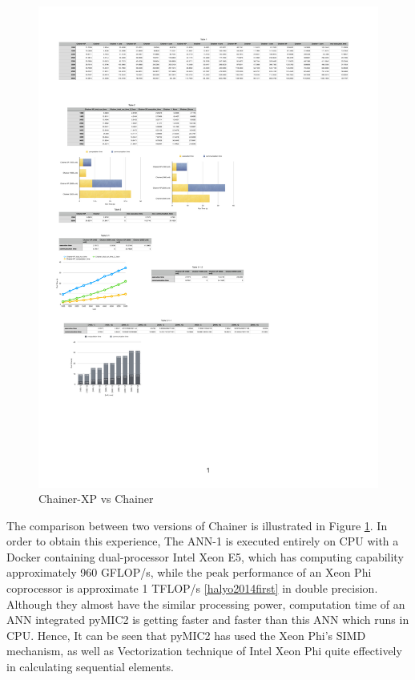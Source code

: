 \begin{figure}[]
\centering
\includegraphics[scale=0.6]{img/c.pdf}
\caption{Chainer-XP vs Chainer}
\label{chainer-xp-vs-chainer}
\end{figure}

The comparison between two versions of Chainer is illustrated in Figure \ref{chainer-xp-vs-chainer}. In order to obtain this experience, The ANN-1 is executed entirely on CPU with a Docker containing dual-processor Intel Xeon E5, which has computing capability approximately 960 GFLOP/s, while the peak performance of an Xeon Phi coprocessor is approximate 1 TFLOP/s \ref{halyo2014first} in double precision. Although they almost have the similar processing power, computation time of an ANN integrated pyMIC2  is getting faster and faster than this ANN which runs in CPU. Hence, It can be seen that pyMIC2 has used the Xeon Phi's SIMD mechanism, as well as Vectorization technique of Intel Xeon Phi quite effectively in calculating sequential elements.
